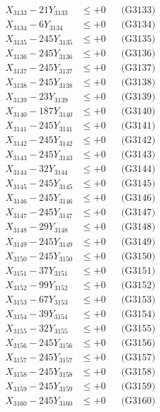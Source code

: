 \documentclass[a4paper,10pt]{article}
\begin{document}
{\begin{align}
X_{3133} - 21Y_{3133} &\leq +0 && \text{(G3133)} \\
X_{3134} - 6Y_{3134} &\leq +0 && \text{(G3134)} \\
X_{3135} - 245Y_{3135} &\leq +0 && \text{(G3135)} \\
X_{3136} - 245Y_{3136} &\leq +0 && \text{(G3136)} \\
X_{3137} - 245Y_{3137} &\leq +0 && \text{(G3137)} \\
X_{3138} - 245Y_{3138} &\leq +0 && \text{(G3138)} \\
X_{3139} - 23Y_{3139} &\leq +0 && \text{(G3139)} \\
X_{3140} - 187Y_{3140} &\leq +0 && \text{(G3140)} \\
\allowbreak
X_{3141} - 245Y_{3141} &\leq +0 && \text{(G3141)} \\
X_{3142} - 245Y_{3142} &\leq +0 && \text{(G3142)} \\
X_{3143} - 245Y_{3143} &\leq +0 && \text{(G3143)} \\
X_{3144} - 32Y_{3144} &\leq +0 && \text{(G3144)} \\
X_{3145} - 245Y_{3145} &\leq +0 && \text{(G3145)} \\
X_{3146} - 245Y_{3146} &\leq +0 && \text{(G3146)} \\
X_{3147} - 245Y_{3147} &\leq +0 && \text{(G3147)} \\
X_{3148} - 29Y_{3148} &\leq +0 && \text{(G3148)} \\
X_{3149} - 245Y_{3149} &\leq +0 && \text{(G3149)} \\
X_{3150} - 245Y_{3150} &\leq +0 && \text{(G3150)} \\
\allowbreak
X_{3151} - 37Y_{3151} &\leq +0 && \text{(G3151)} \\
X_{3152} - 99Y_{3152} &\leq +0 && \text{(G3152)} \\
X_{3153} - 67Y_{3153} &\leq +0 && \text{(G3153)} \\
X_{3154} - 39Y_{3154} &\leq +0 && \text{(G3154)} \\
X_{3155} - 32Y_{3155} &\leq +0 && \text{(G3155)} \\
X_{3156} - 245Y_{3156} &\leq +0 && \text{(G3156)} \\
X_{3157} - 245Y_{3157} &\leq +0 && \text{(G3157)} \\
X_{3158} - 245Y_{3158} &\leq +0 && \text{(G3158)} \\
X_{3159} - 245Y_{3159} &\leq +0 && \text{(G3159)} \\
X_{3160} - 245Y_{3160} &\leq +0 && \text{(G3160)} \\

\end{align}}
\end{document}
